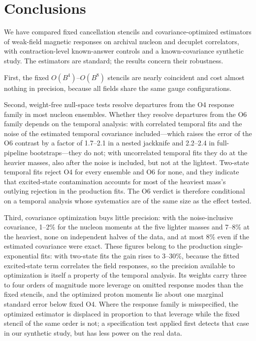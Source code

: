 \documentclass[aps,prd,reprint,twocolumn,superscriptaddress,nofootinbib,longbibliography]{revtex4-2}
\begin{document}
\section{Conclusions}

We have compared fixed cancellation stencils and covariance-optimized estimators of weak-field magnetic responses on archival nucleon and decuplet correlators, with contraction-level known-answer controls and a known-covariance synthetic study. The estimators are standard; the results concern their robustness.

First, the fixed $O(B^4)$--$O(B^8)$ stencils are nearly coincident and cost almost nothing in precision, because all fields share the same gauge configurations.

Second, weight-free null-space tests resolve departures from the O4 response family in most nucleon ensembles. Whether they resolve departures from the O6 family depends on the temporal analysis: with correlated temporal fits and the noise of the estimated temporal covariance included---which raises the error of the O6 contrast by a factor of 1.7--2.1 in a nested jackknife and 2.2--2.4 in full-pipeline bootstraps---they do not; with uncorrelated temporal fits they do at the heavier masses, also after the noise is included, but not at the lightest. Two-state temporal fits reject O4 for every ensemble and O6 for none, and they indicate that excited-state contamination accounts for most of the heaviest mass's outlying rejection in the production fits. The O6 verdict is therefore conditional on a temporal analysis whose systematics are of the same size as the effect tested.

Third, covariance optimization buys little precision: with the noise-inclusive covariance, 1--2\% for the nucleon moments at the five lighter masses and 7--8\% at the heaviest, none on independent halves of the data, and at most 8\% even if the estimated covariance were exact. These figures belong to the production single-exponential fits: with two-state fits the gain rises to 3--30\%, because the fitted excited-state term correlates the field responses, so the precision available to optimization is itself a property of the temporal analysis. Its weights carry three to four orders of magnitude more leverage on omitted response modes than the fixed stencils, and the optimized proton moments lie about one marginal standard error below fixed O4. Where the response family is misspecified, the optimized estimator is displaced in proportion to that leverage while the fixed stencil of the same order is not; a specification test applied first detects that case in our synthetic study, but has less power on the real data.
\end{document}
